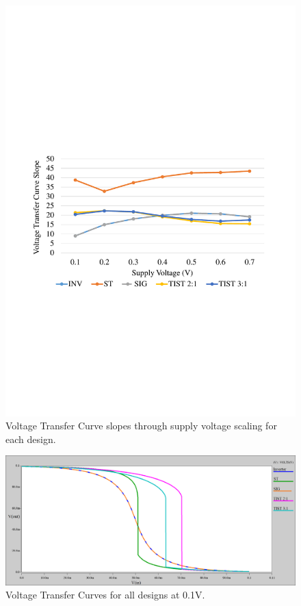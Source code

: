 \documentclass[pgmicro,mestrado,english]{iiufrgs}
\begin{document}
    \begin{figure}[]
        \centering
            \includegraphics[width=1\textwidth, trim={1.25cm 9cm 2cm 10cm}, clip]{slopes.pdf}
            \caption{Voltage Transfer Curve slopes through supply voltage scaling for each design.}
        \label{fig:slopes}
    \end{figure}

    \begin{figure}[]
        \centering
            \includegraphics[width=1\textwidth, trim={0cm 0cm 0cm 0cm}, clip]{vtcs01.png}
            \caption{Voltage Transfer Curves for all designs at 0.1V.}
        \label{fig:vtcs01}
    \end{figure}
\end{document}
